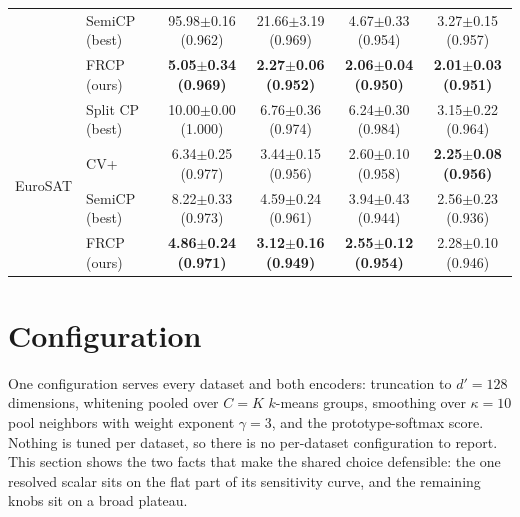 \begin{table}[h]
\begin{center}
\begin{tabular}{llcccc}
 & SemiCP (best) & 95.98$\pm$0.16 {\scriptsize(0.962)} & 21.66$\pm$3.19 {\scriptsize(0.969)} & 4.67$\pm$0.33 {\scriptsize(0.954)} & 3.27$\pm$0.15 {\scriptsize(0.957)}\\
 & FRCP (ours) & \textbf{5.05$\pm$0.34 {\scriptsize(0.969)}} & \textbf{2.27$\pm$0.06 {\scriptsize(0.952)}} & \textbf{2.06$\pm$0.04 {\scriptsize(0.950)}} & \textbf{2.01$\pm$0.03 {\scriptsize(0.951)}}\\
\midrule
\multirow{4}{*}{EuroSAT} & Split CP (best) & 10.00$\pm$0.00 {\scriptsize(1.000)} & 6.76$\pm$0.36 {\scriptsize(0.974)} & 6.24$\pm$0.30 {\scriptsize(0.984)} & 3.15$\pm$0.22 {\scriptsize(0.964)}\\
 & CV+ & 6.34$\pm$0.25 {\scriptsize(0.977)} & 3.44$\pm$0.15 {\scriptsize(0.956)} & 2.60$\pm$0.10 {\scriptsize(0.958)} & \textbf{2.25$\pm$0.08 {\scriptsize(0.956)}}\\
 & SemiCP (best) & 8.22$\pm$0.33 {\scriptsize(0.973)} & 4.59$\pm$0.24 {\scriptsize(0.961)} & 3.94$\pm$0.43 {\scriptsize(0.944)} & 2.56$\pm$0.23 {\scriptsize(0.936)}\\
 & FRCP (ours) & \textbf{4.86$\pm$0.24 {\scriptsize(0.971)}} & \textbf{3.12$\pm$0.16 {\scriptsize(0.949)}} & \textbf{2.55$\pm$0.12 {\scriptsize(0.954)}} & 2.28$\pm$0.10 {\scriptsize(0.946)}\\
\bottomrule
\end{tabular}
\end{center}
\end{table}

\section{Configuration}
\label{app:config}

One configuration serves every dataset and both encoders: truncation
to $d' = 128$ dimensions, whitening pooled over $C = K$ $k$-means
groups, smoothing over $\kappa = 10$ pool neighbors with weight
exponent $\gamma = 3$, and the prototype-softmax score. Nothing is
tuned per dataset, so there is no per-dataset configuration to report.
This section shows the two facts that make the shared choice
defensible: the one resolved scalar sits on the flat part of its
sensitivity curve, and the remaining knobs sit on a broad plateau.

